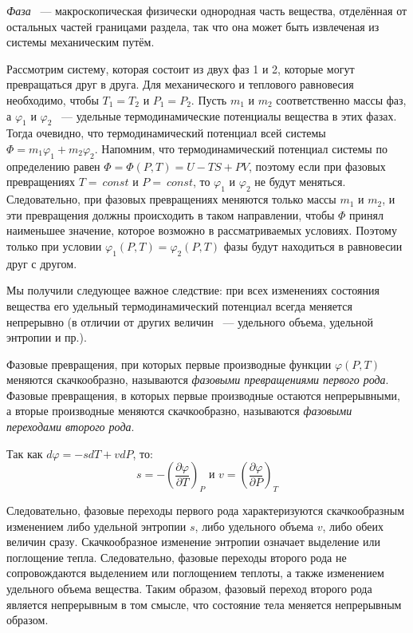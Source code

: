 \documentclass[a4paper, 12pt]{article}
\begin{document}
\emph{Фаза} ~--- макроскопическая физически однородная часть вещества, отделённая от остальных частей границами раздела, так что она может быть извлеченая из системы механическим путём.

Рассмотрим систему, которая состоит из двух фаз 1 и 2, которые могут превращаться друг в друга. Для механического и теплового равновесия необходимо, чтобы $T_1 = T_2$ и $P_1 = P_2$. Пусть $m_1$ и $m_2$ соответственно массы фаз, а $\varphi_1$ и $\varphi_2$  ~--- удельные термодинамические потенциалы вещества в этих фазах. Тогда очевидно, что термодинамический потенциал всей системы $\Phi = m_1 \varphi_1 + m_2 \varphi_2$. Напомним, что термодинамический потенциал системы по определению равен $\Phi = \Phi(P, T) = U - TS + PV$, поэтому если при фазовых превращениях $T = ~const$ и $P =~const$, то $\varphi_1$ и $\varphi_2$ не будут меняться. Следовательно, при фазовых превращениях меняются только массы $m_1$ и $m_2$, и эти превращения должны происходить в таком направлении, чтобы $\Phi$ принял наименьшее значение, которое возможно в рассматриваемых условиях. Поэтому только при условии $\varphi_1(P, T) = \varphi_2(P, T)$ фазы будут находиться в равновесии друг с другом.

Мы получили следующее важное следствие: при всех изменениях состояния вещества его удельный термодинамический потенциал всегда меняется непрерывно (в отличии от других величин ~--- удельного объема, удельной энтропии и пр.).

Фазовые превращения, при которых первые производные функции $\varphi(P, T)$ меняются скачкообразно, называются \emph{фазовыми превращениями первого рода}. Фазовые превращения, в которых первые производные остаются непрерывными, а вторые производные меняются скачкообразно, называются \emph{фазовыми переходами второго рода}.

Так как $ d \varphi = - s dT + v d P$, то:
$$
	s = - \left( \frac{\partial \varphi }{\partial T} \right)_{P} \text{ и } 
	v = \left( \frac{\partial \varphi }{\partial P} \right)_{T} 
$$

Следовательно, фазовые переходы первого рода характеризуются скачкообразным изменением либо удельной энтропии $s$, либо удельного объема $v$, либо обеих величин сразу. Скачкообразное изменение энтропии означает выделение или поглощение тепла. Следовательно, фазовые переходы второго рода не сопровождаются выделением или поглощением теплоты, а также изменением удельного объема вещества. Таким образом, фазовый переход второго рода является непрерывным в том смысле, что состояние тела меняется непрерывным образом.
\end{document}
